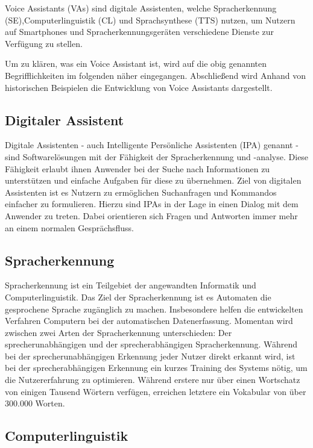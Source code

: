 Voice Assistants (VAs) sind digitale Assistenten, welche Spracherkennung (SE),Computerlinguistik (CL) und Sprachsynthese (TTS) nutzen, um Nutzern auf Smartphones und Spracherkennungsgeräten verschiedene Dienste zur Verfügung zu stellen.

Um zu klären, was ein Voice Assistant ist, wird auf die obig genannten Begrifflichkeiten im folgenden näher eingegangen. Abschließend wird Anhand von historischen Beispielen die Entwicklung von Voice Assistants dargestellt.

\subsection{Digitaler Assistent}

Digitale Assistenten - auch Intelligente Persönliche Assistenten (IPA) genannt - sind Softwarelösungen mit der Fähigkeit der Spracherkennung und -analyse. Diese Fähigkeit erlaubt ihnen Anwender bei der Suche nach Informationen zu unterstützen und einfache Aufgaben für diese zu übernehmen. Ziel von digitalen Assistenten ist es Nutzern zu ermöglichen Suchanfragen und Kommandos einfacher zu formulieren. Hierzu sind IPAs in der Lage in einen Dialog mit dem Anwender zu treten. Dabei orientieren sich Fragen und Antworten immer mehr an einem normalen Gesprächsfluss.

\subsection{Spracherkennung}

Spracherkennung ist ein Teilgebiet der angewandten Informatik und Computerlinguistik. Das Ziel der Spracherkennung ist es Automaten die gesprochene Sprache zugänglich zu machen. Insbesondere helfen die entwickelten Verfahren Computern bei der automatischen Datenerfassung. Momentan wird zwischen zwei Arten der Spracherkennung unterschieden: Der sprecherunabhängigen und der sprecherabhängigen Spracherkennung. Während bei der sprecherunabhängigen Erkennung jeder Nutzer direkt erkannt wird, ist bei der sprecherabhängigen Erkennung ein kurzes Training des Systems nötig, um die Nutzererfahrung zu optimieren. Während erstere nur über einen Wortschatz von einigen Tausend Wörtern verfügen, erreichen letztere ein Vokabular von über 300.000 Worten.

\subsection{Computerlinguistik}

